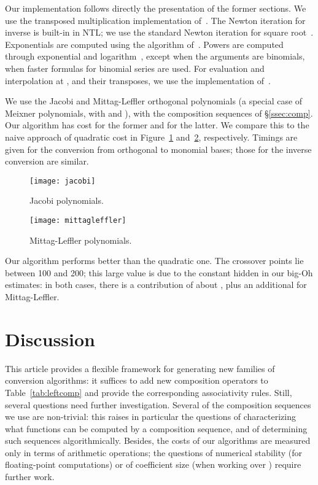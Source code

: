 \documentclass{sig-alternate}
\begin{document}
Our implementation follows directly the presentation of the former
sections. We use the transposed multiplication implementation
of~\cite{BoLeSc03}. The Newton iteration for inverse is built-in in
NTL; we use the standard Newton iteration for square
root~\cite{Brent75}. Exponentials are computed using the algorithm
of~\cite{HaZi04}. Powers are computed through exponential and
logarithm~\cite{Brent75}, except when the arguments are binomials,
when faster formulas for binomial series are used. For evaluation and
interpolation at , and their transposes, we use the
implementation of~\cite{BoLeSc03}.

We use the Jacobi and Mittag-Leffler orthogonal polynomials (a special
case of Meixner polynomials, with  and ), with the
composition sequences of \S\ref{ssec:comp}. Our algorithm has cost
 for the former and  for the latter.  We
compare this to the naive approach of quadratic cost in
Figure~\ref{Fig:jacobi} and~\ref{Fig:mittag}, respectively. Timings
are given for the conversion from orthogonal to monomial bases; those
for the inverse conversion are similar.
\begin{figure}[!!!!!!!!!h]
\centerline{\texttt{[image: jacobi]}}
\vspace{-3ex}
\caption{{\small Jacobi polynomials.}}
\label{Fig:jacobi}
\end{figure}
\vspace{-5ex}
\begin{figure}[!!!!!!!!!h]
\centerline{\texttt{[image: mittagleffler]}}
\vspace{-3ex}
\caption{{\small Mittag-Leffler polynomials.}}
\label{Fig:mittag}
\end{figure}

Our algorithm performs better than the quadratic one. The crossover
points lie between 100 and 200; this large value is due to the
constant hidden in our big-Oh estimates: in both cases, there is a
contribution of about , plus an additional  for
Mittag-Leffler.





\section{Discussion}

This article provides a flexible framework for generating new families
of conversion algorithms: it suffices to add new composition operators
to Table~\ref{tab:leftcomp} and provide the corresponding
associativity rules.  Still, several questions need further
investigation. Several of the composition sequences we use are
non-trivial: this raises in particular the questions of characterizing
what functions can be computed by a composition sequence, and of
determining such sequences algorithmically.  Besides, the costs of our
algorithms are measured only in terms of arithmetic operations; the
questions of numerical stability (for floating-point computations) or
of coefficient size (when working over ) require further work.
\end{document}
